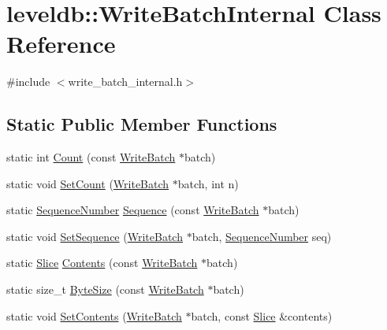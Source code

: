 \hypertarget{classleveldb_1_1_write_batch_internal}{}\section{leveldb\+:\+:Write\+Batch\+Internal Class Reference}
\label{classleveldb_1_1_write_batch_internal}


{\ttfamily \#include $<$write\+\_\+batch\+\_\+internal.\+h$>$}

\subsection*{Static Public Member Functions}
\begin{DoxyCompactItemize}
\item 
static int \hyperlink{classleveldb_1_1_write_batch_internal_a5270ca4567dbae1524005ad14e0698e3}{Count} (const \hyperlink{classleveldb_1_1_write_batch}{Write\+Batch} $\ast$batch)
\item 
static void \hyperlink{classleveldb_1_1_write_batch_internal_ae03d20619da53aae175dd28d61c90bd9}{Set\+Count} (\hyperlink{classleveldb_1_1_write_batch}{Write\+Batch} $\ast$batch, int n)
\item 
static \hyperlink{namespaceleveldb_a5481ededd221c36d652c371249f869fa}{Sequence\+Number} \hyperlink{classleveldb_1_1_write_batch_internal_af657c82bd9378b78c35a3a7429f945d4}{Sequence} (const \hyperlink{classleveldb_1_1_write_batch}{Write\+Batch} $\ast$batch)
\item 
static void \hyperlink{classleveldb_1_1_write_batch_internal_a0ca3483de37433fb0ce37b1e91f01bd1}{Set\+Sequence} (\hyperlink{classleveldb_1_1_write_batch}{Write\+Batch} $\ast$batch, \hyperlink{namespaceleveldb_a5481ededd221c36d652c371249f869fa}{Sequence\+Number} seq)
\item 
static \hyperlink{classleveldb_1_1_slice}{Slice} \hyperlink{classleveldb_1_1_write_batch_internal_a348947b16653c8a17590b13115b5274d}{Contents} (const \hyperlink{classleveldb_1_1_write_batch}{Write\+Batch} $\ast$batch)
\item 
static size\+\_\+t \hyperlink{classleveldb_1_1_write_batch_internal_adad424f13cc3e3ed4a2eacb88eaa39df}{Byte\+Size} (const \hyperlink{classleveldb_1_1_write_batch}{Write\+Batch} $\ast$batch)
\item 
static void \hyperlink{classleveldb_1_1_write_batch_internal_aa07e75250aed00d06f2e4df85ee926b9}{Set\+Contents} (\hyperlink{classleveldb_1_1_write_batch}{Write\+Batch} $\ast$batch, const \hyperlink{classleveldb_1_1_slice}{Slice} \&contents)

\end{DoxyCompactItemize}
